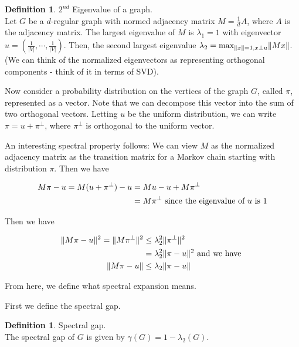 \documentclass[11pt]{article}
\theoremstyle{definition}
\newtheorem{definition}[theorem]{Definition}
\theoremstyle{definition}
\theoremstyle{definition}
\newcommand{\txt}[1]
{\textnormal{#1}}
\begin{document}
\begin{definition} $2^{nd}$ Eigenvalue of a graph. \\
Let $G$ be a $d$-regular graph with normed adjacency matrix $M = \frac{1}{d}A$, where $A$ is the adjacency matrix. 
The largest eigenvalue of $M$ is $\lambda_1 = 1$ with eigenvector $u = \left(\frac{1}{|V|}, \cdots, \frac{1}{|V|}\right)$. Then, the second largest eigenvalue $\lambda_2 = \txt{max}_{\|x\| = 1, x \perp u} \|Mx\|$. (We can think of the normalized eigenvectors as representing orthogonal components - think of it in terms of SVD). 
\end{definition}

Now consider a probability distribution on the vertices of the graph $G$, called $\pi$, represented as a vector. Note that we can decompose this vector into the sum of two orthogonal vectors. Letting $u$ be the uniform distribution, we can write $\pi = u + \pi^{\perp}$, where $\pi^{\perp}$ is orthogonal to the uniform vector. 

An interesting spectral property follows: We can view $M$ as the normalized adjacency matrix as the transition matrix for a Markov chain starting with distribution $\pi$. Then we have 

\begin{align}
\begin{split}
M\pi - u = M(u + \pi^{\perp}) - u &= Mu - u + M\pi^{\perp}
\\
&= M\pi^{\perp} \txt{ since the eigenvalue of } u \txt{ is } 1
\end{split}
\end{align}

Then we have 

\begin{align}
\begin{split}
\|M\pi - u\|^2 = \|M\pi^{\perp}\|^2 &\leq \lambda_2^2 \|\pi^{\perp}\|^2
\\
&= \lambda_2^2 \|\pi - u\|^2 \txt{ and we have }
\\
\|M\pi - u\| &\leq \lambda_2 \|\pi - u\|
\end{split}
\end{align}

From here, we define what spectral expansion means. 

First we define the spectral gap. 
\begin{definition} Spectral gap. \\
The spectral gap of $G$ is given by 
$\gamma(G) = 1 - \lambda_2(G)$.
\end{definition}
\end{document}
